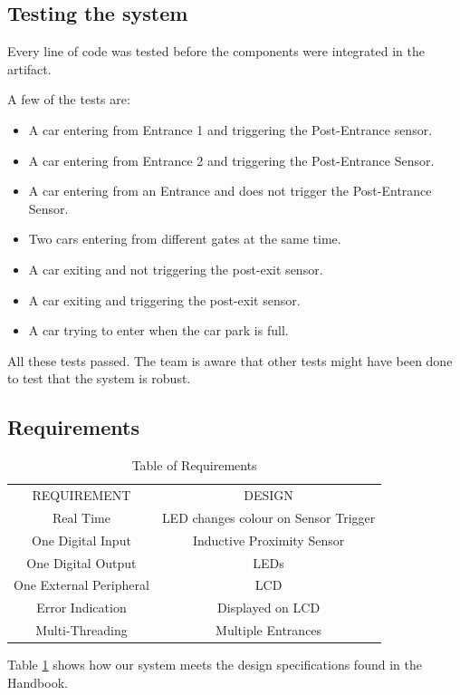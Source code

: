 \documentclass[11pt,a4paper,twocolumn]{article}
\begin{document}
\subsection{Testing the system}

Every line of code was tested before the components were integrated in the artifact. 

A few of the tests are:

\begin{itemize}
	\item A car entering from Entrance 1 and triggering the Post-Entrance sensor.
	\item A car entering from Entrance 2 and triggering the Post-Entrance Sensor.
	\item A car entering from an Entrance and does not trigger the Post-Entrance Sensor. 
	\item Two cars entering from different gates at the same time.
	\item A car exiting and not triggering the post-exit sensor.
	\item A car exiting and triggering the post-exit sensor.
	\item A car trying to enter when the car park is full.

\end{itemize}

All these tests passed. The team is aware that other tests might have been done to test that the system is robust. 

\subsection{Requirements}
	\begin{table}[t]
		\centering
	\begin{tabular}{ c c  }
	REQUIREMENT & DESIGN  \\ 
	Real Time  & LED changes colour on Sensor Trigger  \\  
	One Digital Input & Inductive Proximity Sensor\\
	One Digital Output & LEDs\\
	One External Peripheral & LCD\\
	Error Indication & Displayed on LCD\\
	Multi-Threading & Multiple Entrances
\end{tabular}
\caption{Table of Requirements}
\label{tab:1}
\end{table}

 Table \ref{tab:1} shows how our system meets the design specifications found in the Handbook.
\end{document}
